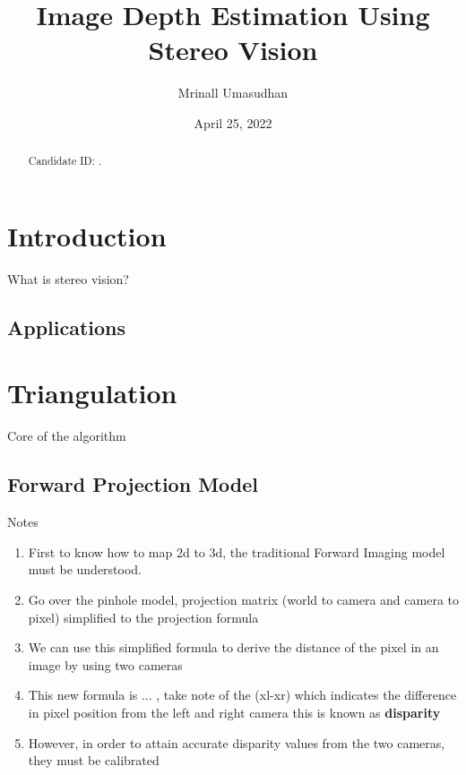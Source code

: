 \documentclass[11pt]{scrartcl}
\begin{document}
\title{Image Depth Estimation Using Stereo Vision}
\author{Mrinall Umasudhan}
\date{April 25, 2022}
\maketitle
{}

\begin{abstract}
	Candidate ID: .
\end{abstract}

\tableofcontents


\newpage
\section{Introduction}

What is stereo vision?

\subsection{Applications}    







\section{Triangulation}

Core of the algorithm

\subsection{Forward Projection Model}
\begin{remark}
    Notes{\begin{enumerate}
        \item First to know how to map 2d to 3d, the traditional Forward Imaging model must be understood. 
        \item Go over the pinhole model, projection matrix (world to camera and camera to pixel) simplified to the projection formula
        \item We can use this simplified formula to derive the distance of the pixel in an image by using two cameras
        \item This new formula is ... , take note of the (xl-xr) which indicates the difference in pixel position from the left and right camera
            this is known as \textbf{disparity}
        \item However, in order to attain accurate disparity values from the two cameras, they must be calibrated 
    \end{enumerate}} %
    \label{par:Notes}
    
\end{remark}
\end{document}
